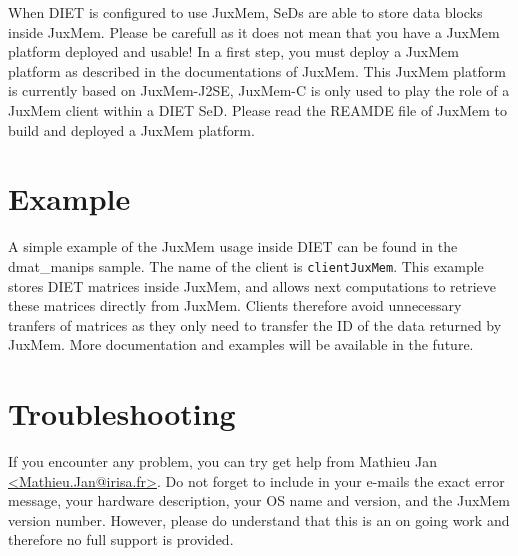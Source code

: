 When DIET is configured to use JuxMem, SeDs are able to store data
blocks inside JuxMem. Please be carefull as it does not mean that you
have a JuxMem platform deployed and usable!  In a first step, you must
deploy a JuxMem platform as described in the documentations of
JuxMem. This JuxMem platform is currently based on JuxMem-J2SE,
JuxMem-C is only used to play the role of a JuxMem client within a
DIET SeD. Please read the REAMDE file of JuxMem to build and deployed
a JuxMem platform.

\section{Example}

A simple example of the JuxMem usage inside DIET can be found in the
dmat_manips sample. The name of the client is
\texttt{clientJuxMem}. This example stores DIET matrices inside JuxMem, 
and allows next computations to retrieve these matrices directly from
JuxMem. Clients therefore avoid unnecessary tranfers of matrices as
they only need to transfer the ID of the data returned by JuxMem. More
documentation and examples will be available in the future.

\section{Troubleshooting}

If you encounter any problem, you can try get help from Mathieu Jan
\url{<Mathieu.Jan@irisa.fr>}. Do not forget to 
include in your e-mails the exact error message, your hardware
description, your OS name and version, and the JuxMem version number.
However, please do understand that this is an on going work and
therefore no full support is provided.
